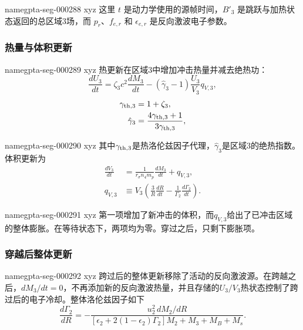 \documentclass[twocolumn]{aastex702}
\makeatletter
\providecommand{\gptareaderanchor}[1]{\pdfdest name{#1} xyz}%
\providecommand{\gptareaderanchor}[1]{\special{pdf:dest (#1) [ @thispage /XYZ @xpos @ypos null ]}}%
\makeatother
\begin{document}
\gptareaderanchor{gpta-seg-000288}%
这里 \(t\) 是动力学使用的源帧时间，\(B'_3\) 是跳跃与加热状态返回的总区域3场，而 \(p_r\)、\(f_{e,r}\) 和 \(\epsilon_{e,r}\) 是反向激波电子参数。

\subsubsection{热量与体积更新}


\gptareaderanchor{gpta-seg-000289}%
热更新在区域3中增加冲击热量并减去绝热功：
\begin{equation}
\frac{dU_3}{dt}=\zeta_3c^2\frac{dM_3}{dt}
-(\hat{\gamma}_{3}-1)\frac{U_3}{V_3}q_{V,3},
\end{equation}
\begin{equation}
\begin{aligned}
\gamma_{{\rm th},3}&=1+\zeta_3,\\
\hat{\gamma}_{3}&=
\frac{4\gamma_{{\rm th},3}+1}{3\gamma_{{\rm th},3}},
\end{aligned}
\end{equation}

\gptareaderanchor{gpta-seg-000290}%
其中\(\gamma_{{\rm th},3}\)是热洛伦兹因子代理，\(\hat{\gamma}_3\)是区域3的绝热指数。体积更新为
\begin{equation}
\begin{aligned}
\frac{dV_3}{dt}&=\frac{1}{r_\sigma n_4m_p}\frac{dM_3}{dt}
+q_{V,3},\\
q_{V,3}&\equiv V_3\left(\frac{3}{R}\frac{dR}{dt}
-\frac{1}{\Gamma_2}\frac{d\Gamma_2}{dt}\right).
\end{aligned}
\end{equation}

\gptareaderanchor{gpta-seg-000291}%
第一项增加了新冲击的体积，而\(q_{V,3}\)给出了已冲击区域的整体膨胀。在等待状态下，两项均为零。穿过之后，只剩下膨胀项。

\subsubsection{穿越后整体更新}


\gptareaderanchor{gpta-seg-000292}%
跨过后的整体更新移除了活动的反向激波源。在跨越之后，\(dM_3/dt=0\)，不再添加新的反向激波热量，并且存储的\(U_3/V_3\)热状态控制了跨过后的电子冷却。整体洛伦兹因子如下
\begin{equation}
\frac{d\Gamma_2}{dR}
=-\frac{u_2^2\,dM_2/dR}
{[\epsilon_2+2(1-\epsilon_2)\Gamma_2]M_2+M_3+M_B+M_s}.
\end{equation}
\end{document}
